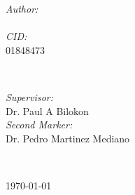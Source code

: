 \begin{titlepage}
\begin{minipage}{0.4\textwidth}
\begin{flushleft} \large
\emph{Author:}\\
\@author \\ [1.2em] %
\emph{CID:} \\
01848473
\end{flushleft}
\end{minipage}
~
\begin{minipage}{0.4\textwidth}
\begin{flushright} \large
\emph{Supervisor:} \\
Dr. Paul A Bilokon \\[1.2em] %
\emph{Second Marker:} \\
Dr. Pedro Martinez Mediano %
\end{flushright}
\end{minipage}\\[2cm]
\makeatother



{\large \today}\\[2cm] %

\vfill %

\end{titlepage}